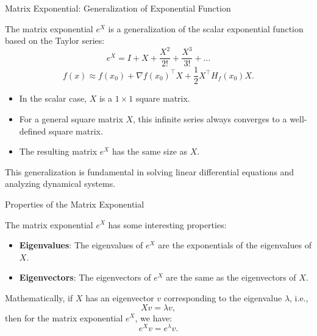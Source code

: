 \documentclass{beamer}
\begin{document}
\begin{frame}{Matrix Exponential: Generalization of Exponential Function}

The matrix exponential \( e^X \) is a generalization of the scalar exponential function based on the Taylor series:
\[
e^X = I + X + \frac{X^2}{2!} + \frac{X^3}{3!} + \dots
\]
\[
f(x) \approx f(x_0) + \nabla f(x_0)^\top X + \frac{1}{2} X^\top H_f(x_0) X.
\]

\begin{itemize}
    \item In the scalar case, \(X\) is a \(1 \times 1\) square matrix.
    \item For a general square matrix \(X\), this infinite series always converges to a well-defined square matrix.
    \item The resulting matrix \(e^X\) has the same size as \(X\).
\end{itemize}
\scriptsize
This generalization is fundamental in solving linear differential equations and analyzing dynamical systems.
\end{frame}

\begin{frame}{Properties of the Matrix Exponential}

The matrix exponential \( e^X \) has some interesting properties:

\begin{itemize}
    \item \textbf{Eigenvalues}: The eigenvalues of \( e^X \) are the exponentials of the eigenvalues of \( X \).
    \item \textbf{Eigenvectors}: The eigenvectors of \( e^X \) are the same as the eigenvectors of \( X \).
\end{itemize}

Mathematically, if \( X \) has an eigenvector \( v \) corresponding to the eigenvalue \( \lambda \), i.e.,
\[
X v = \lambda v,
\]
then for the matrix exponential \( e^X \), we have:
\[
e^X v = e^{\lambda} v.
\]

\end{frame}
\end{document}
